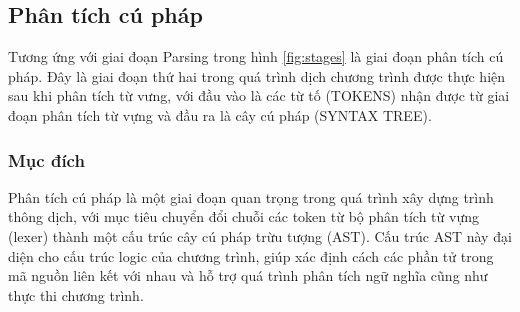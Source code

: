\subsection{Phân tích cú pháp}

Tương ứng với giai đoạn Parsing trong hình \ref{fig:stages} là giai đoạn phân tích cú pháp. Đây là giai đoạn thứ hai trong quá trình dịch chương trình được thực hiện sau khi phân tích từ vưng, với đầu vào là các từ tố (TOKENS) nhận được từ giai đoạn phân tích từ vựng và đầu ra là cây cú pháp (SYNTAX TREE).

\subsubsection{Mục đích}
Phân tích cú pháp là một giai đoạn quan trọng trong quá trình xây dựng trình thông dịch, với mục tiêu chuyển đổi chuỗi các token từ bộ phân tích từ vựng (lexer) thành một cấu trúc cây cú pháp trừu tượng (AST). Cấu trúc AST này đại diện cho cấu trúc logic của chương trình, giúp xác định cách các phần tử trong mã nguồn liên kết với nhau và hỗ trợ quá trình phân tích ngữ nghĩa cũng như thực thi chương trình.

    
    
    

